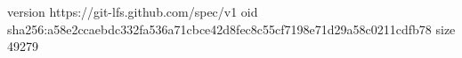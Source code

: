 version https://git-lfs.github.com/spec/v1
oid sha256:a58e2ccaebdc332fa536a71cbce42d8fec8c55cf7198e71d29a58c0211cdfb78
size 49279
